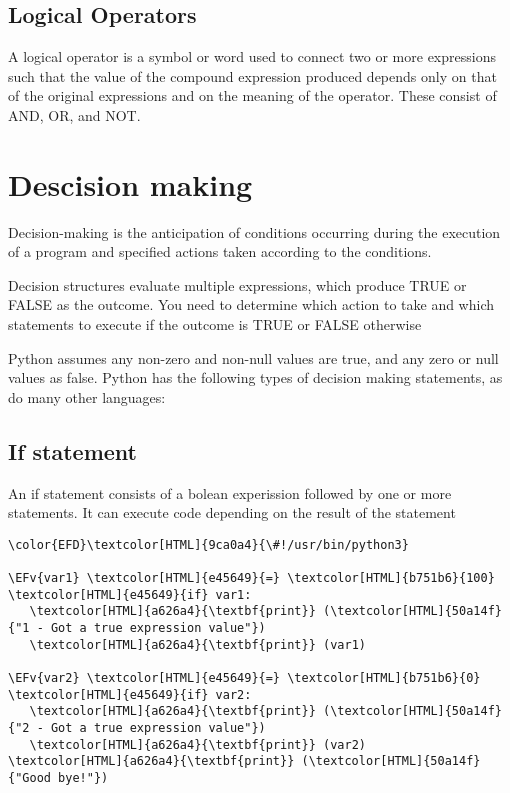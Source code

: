 \documentclass{scrartcl}
\newcommand{\EFv}[1]{\textcolor{EFv}{#1}} %
\begin{document}
\subsection{Logical Operators}
\label{sec:org95c2b49}
A logical operator is a symbol or word used to connect two or more expressions
such that the value of the compound expression produced depends only on that of
the original expressions and on the meaning of the operator. These consist of
AND, OR, and NOT.

\section{Descision making}
\label{sec:orgbb8c222}
Decision-making is the anticipation of conditions occurring during the execution of a program and specified actions taken according to the conditions.

Decision structures evaluate multiple expressions, which produce TRUE or FALSE
as the outcome. You need to determine which action to take and which statements
to execute if the outcome is TRUE or FALSE otherwise

Python assumes any non-zero and non-null values are true, and any zero or null
values as false. Python has the following types of decision making statements,
as do many other languages:

\subsection{If statement}
\label{sec:orga5f8c92}
An if statement consists of a bolean experission followed by one or more
statements. It can execute code depending on the result of the statement
\begin{Code}
\begin{Verbatim}[]
\color{EFD}\textcolor[HTML]{9ca0a4}{\#!/usr/bin/python3}

\EFv{var1} \textcolor[HTML]{e45649}{=} \textcolor[HTML]{b751b6}{100}
\textcolor[HTML]{e45649}{if} var1:
   \textcolor[HTML]{a626a4}{\textbf{print}} (\textcolor[HTML]{50a14f}{"1 - Got a true expression value"})
   \textcolor[HTML]{a626a4}{\textbf{print}} (var1)

\EFv{var2} \textcolor[HTML]{e45649}{=} \textcolor[HTML]{b751b6}{0}
\textcolor[HTML]{e45649}{if} var2:
   \textcolor[HTML]{a626a4}{\textbf{print}} (\textcolor[HTML]{50a14f}{"2 - Got a true expression value"})
   \textcolor[HTML]{a626a4}{\textbf{print}} (var2)
\textcolor[HTML]{a626a4}{\textbf{print}} (\textcolor[HTML]{50a14f}{"Good bye!"})
\end{Verbatim}
\end{Code}
\end{document}
